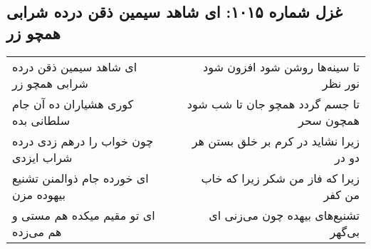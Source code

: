 \begin{center}
\section*{غزل شماره ۱۰۱۵: ای شاهد سیمین ذقن درده شرابی همچو زر}
\label{sec:1015}
\begin{longtable}{l p{0.5cm} r}
ای شاهد سیمین ذقن درده شرابی همچو زر
&&
تا سینه‌ها روشن شود افزون شود نور نظر
\\
کوری هشیاران ده آن جام سلطانی بده
&&
تا جسم گردد همچو جان تا شب شود همچون سحر
\\
چون خواب را درهم زدی درده شراب ایزدی
&&
زیرا نشاید در کرم بر خلق بستن هر دو در
\\
ای خورده جام ذوالمنن تشنیع بیهوده مزن
&&
زیرا که فاز من شکر زیرا که خاب من کفر
\\
ای تو مقیم میکده هم مستی و هم می‌زده
&&
تشنیع‌های بیهده چون می‌زنی ای بی‌گهر
\\
\end{longtable}
\end{center}
